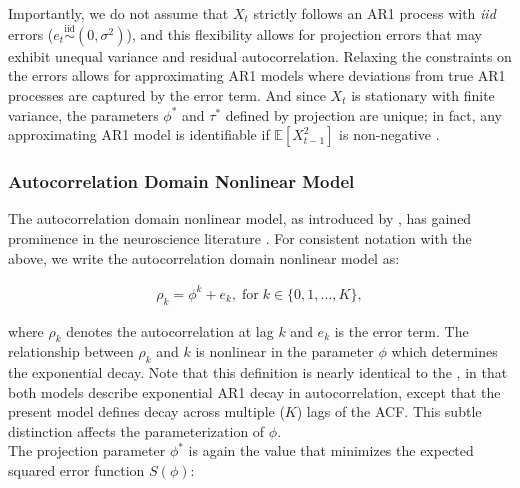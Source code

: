 \documentclass[main.tex]{subfiles}
\begin{document}
Importantly, we do not assume that $X_t$ strictly follows an AR1 process with \textit{iid} errors ($e_t \overset{\text{iid}}{\sim} (0, \sigma^2)$), and this flexibility allows for projection errors that may exhibit unequal variance and residual autocorrelation. Relaxing the constraints on the errors allows for approximating AR1 models where deviations from true AR1 processes are captured by the error term. And since $X_t$ is stationary with finite variance, the parameters $\phi^*$ and $\tau^*$ defined by projection are unique; in fact, any approximating AR1 model is identifiable if $\mathbb{E}[X_{t-1}^2]$ is non-negative \citep[theorem~14.28]{hansen_econometrics_2022}.\\

\subsubsection{Autocorrelation Domain Nonlinear Model}\label{sec:autocorrelation-domain-nonlinear-model}

The autocorrelation domain nonlinear model, as introduced by \citet{murray_hierarchy_2014}, has gained prominence in the neuroscience literature \citep{rossi-pool_invariant_2021, cirillo_neural_2018, ito_cortical_2020, runyan_distinct_2017, zeraati_flexible_2022, nougaret_intrinsic_2021, wasmuht_intrinsic_2018, muller_core_2020, maisson_choice-relevant_2021, li_hierarchical_2022, shafiei_topographic_2020}. For consistent notation with the  above, we write the autocorrelation domain nonlinear model as:

\begin{align}
    \rho_k = \phi^k + e_k, \; \text{for}\; k \in \{0, 1, ..., K\},
\end{align}

\noindent where $\rho_k$ denotes the autocorrelation at lag $k$ and $e_k$ is the error term. The relationship between $\rho_k$ and $k$ is nonlinear in the parameter $\phi$ which determines the exponential decay. Note that this definition is nearly identical to the , in that both models describe exponential AR1 decay in autocorrelation, except that the present model defines decay across multiple ($K$) lags of the ACF. This subtle distinction affects the parameterization of $\phi$.\\

The projection parameter $\phi^*$ is again the value that minimizes the expected squared error function $S(\phi)$:
\end{document}

